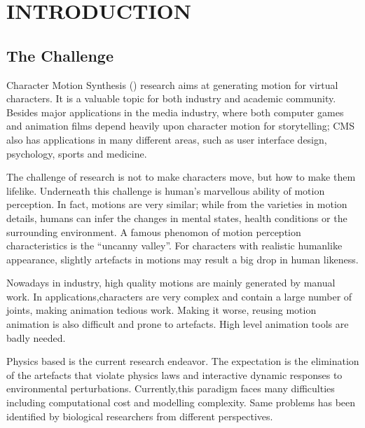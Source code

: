 \chapter{INTRODUCTION}
\label{chap:intro}
\graphicspath{{Introduction/IntroductionFigs/EPS/}{Introduction/IntroductionFigs/}}

\section{The Challenge}
Character Motion Synthesis (\cms) research aims at generating motion for virtual characters.
It is a valuable topic for both industry and academic community. 
Besides major applications in the media industry, where both computer games and animation films depend heavily upon character motion for storytelling;  
CMS also has applications in many different areas, such as user interface design, psychology, sports and medicine.

The challenge of \cms research is not to make characters move, but how to make them lifelike. 
Underneath this challenge is human's marvellous ability of motion perception. 
In fact, motions are very similar; 
while from the varieties in motion details, humans can infer the changes in mental states, health conditions or the surrounding environment.
A famous phenomon of motion perception characteristics is the ``uncanny valley''.
For characters with realistic humanlike appearance, slightly artefacts in motions may result a big drop in human likeness.



Nowadays in industry, high quality motions are mainly generated by manual work. 
In applications,characters are very complex and contain a large number of joints, making animation tedious work.
Making it worse, reusing motion animation is also difficult and prone to artefacts.
High level animation tools are badly needed. 

Physics based \cms is the current research endeavor.
The expectation is the elimination of the artefacts that violate physics laws and interactive dynamic responses to environmental perturbations.
Currently,this paradigm faces many difficulties including computational cost and modelling complexity.
Same problems has been identified by biological researchers from different perspectives.

